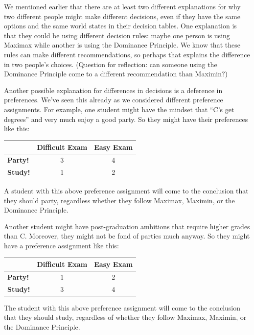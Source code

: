 \documentclass[]{tufte-book}
\begin{document}
We mentioned earlier that there are at least two different explanations for why two different people might make different decisions, even if they have the same options and the same world states in their decision tables. One explanation is that they could be using different decision rules: maybe one person is using Maximax while another is using the Dominance Principle. We know that these rules can make different recommendations, so perhaps that explains the difference in two people's choices. (Question for reflection: can someone using the Dominance Principle come to a different recommendation than Maximin?)

Another possible explanation for differences in decisions is a deference in preferences. We've seen this already as we considered different preference assignments. For example, one student might have the mindset that ``C's get degrees'' and very much enjoy a good party. So they might have their preferences like this:

\begin{longtable}[]{@{}lcc@{}}
\toprule
& Difficult Exam & Easy Exam\tabularnewline
\midrule
\endhead
\textbf{Party!} & 3 & 4\tabularnewline
\textbf{Study!} & 1 & 2\tabularnewline
\bottomrule
\end{longtable}

A student with this above preference assignment will come to the conclusion that they should party, regardless whether they follow Maximax, Maximin, or the Dominance Principle.

Another student might have post-graduation ambitions that require higher grades than C. Moreover, they might not be fond of parties much anyway. So they might have a preference assignment like this:

\begin{longtable}[]{@{}lcc@{}}
\toprule
& Difficult Exam & Easy Exam\tabularnewline
\midrule
\endhead
\textbf{Party!} & 1 & 2\tabularnewline
\textbf{Study!} & 3 & 4\tabularnewline
\bottomrule
\end{longtable}

The student with this above preference assignment will come to the conclusion that they should study, regardless of whether they follow Maximax, Maximin, or the Dominance Principle.
\end{document}
